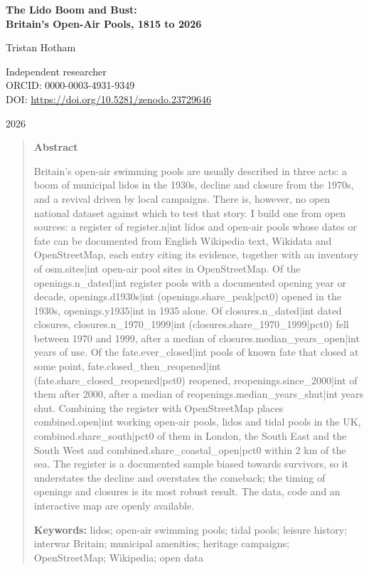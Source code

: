 \documentclass[11pt,a4paper]{article}
\begin{document}
\begin{center}
{\Large\bfseries The Lido Boom and Bust:\\[2pt] Britain's Open-Air Pools, 1815 to 2026\par}
\vspace{1.2em}
{\large Tristan Hotham\par}
\vspace{0.3em}
{\small Independent researcher\\
ORCID: 0000-0003-4931-9349\\
DOI: \href{https://doi.org/10.5281/zenodo.23729646}{https://doi.org/10.5281/zenodo.23729646}\par}
\vspace{0.8em}
2026
\end{center}

\begin{quote}
\small
\begin{center}\textbf{Abstract}\end{center}
Britain's open-air swimming pools are usually described in three acts: a boom of municipal lidos in the 1930s, decline and closure from the 1970s, and a revival driven by local campaigns. There is, however, no open national dataset against which to test that story. I build one from open sources: a register of {{register.n|int}} lidos and open-air pools whose dates or fate can be documented from English Wikipedia text, Wikidata and OpenStreetMap, each entry citing its evidence, together with an inventory of {{osm.sites|int}} open-air pool sites in OpenStreetMap. Of the {{openings.n_dated|int}} register pools with a documented opening year or decade, {{openings.d1930s|int}} ({{openings.share_peak|pct0}}) opened in the 1930s, {{openings.y1935|int}} in 1935 alone. Of {{closures.n_dated|int}} dated closures, {{closures.n_1970_1999|int}} ({{closures.share_1970_1999|pct0}}) fell between 1970 and 1999, after a median of {{closures.median_years_open|int}} years of use. Of the {{fate.ever_closed|int}} pools of known fate that closed at some point, {{fate.closed_then_reopened|int}} ({{fate.share_closed_reopened|pct0}}) reopened, {{reopenings.since_2000|int}} of them after 2000, after a median of {{reopenings.median_years_shut|int}} years shut. Combining the register with OpenStreetMap places {{combined.open|int}} working open-air pools, lidos and tidal pools in the UK, {{combined.share_south|pct0}} of them in London, the South East and the South West and {{combined.share_coastal_open|pct0}} within 2 km of the sea. The register is a documented sample biased towards survivors, so it understates the decline and overstates the comeback; the timing of openings and closures is its most robust result. The data, code and an interactive map are openly available.

\textbf{Keywords:} lidos; open-air swimming pools; tidal pools; leisure history; interwar Britain; municipal amenities; heritage campaigns; OpenStreetMap; Wikipedia; open data
\end{quote}
\end{document}
